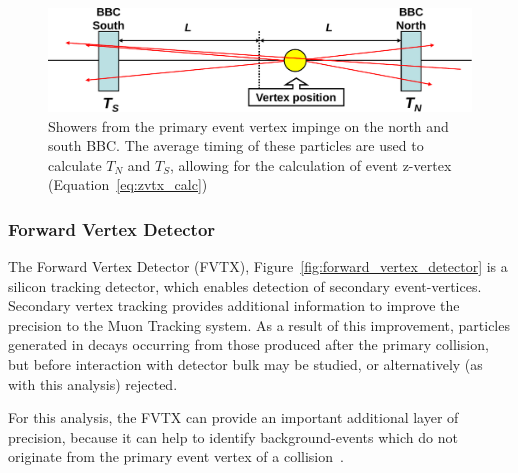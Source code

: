 \begin{figure}[ht]
  \centering
  \includegraphics[width=\linewidth]{./figures/bbc_vertex_reconstruction.pdf}
  \caption{
    Showers from the primary event vertex impinge on the north and south BBC.
    The average timing of these particles are used to calculate $T_N$ and $T_S$,
    allowing for the calculation of event z-vertex (Equation~\ref{eq:zvtx_calc})
  }
  \label{fig:bbc_vertex_reconstruction}
\end{figure}

\clearpage
\subsubsection{Forward Vertex Detector}
\label{sec:forward_vertex_detector}

The Forward Vertex Detector (FVTX), Figure~\ref{fig:forward_vertex_detector} is
a silicon tracking detector, which enables detection of secondary
event-vertices.  Secondary vertex tracking provides additional information to
improve the precision to the Muon Tracking system. As a result of this
improvement, particles generated in decays occurring from those produced
after the primary collision, but before interaction with detector bulk may be
studied, or alternatively (as with this analysis) rejected.

For this analysis, the FVTX can provide an important additional layer of
precision, because it can help to identify background-events which do not
originate from the primary event vertex of a collision~\cite{Aidala2014}.  


